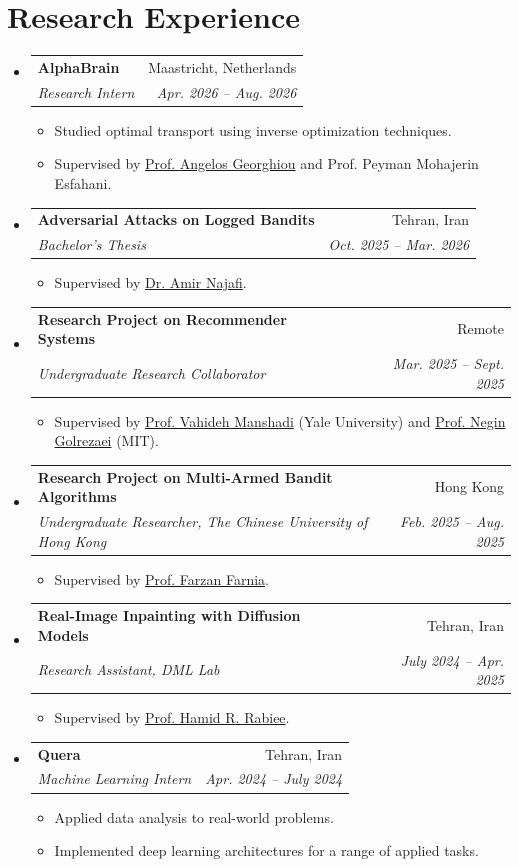 \documentclass[letterpaper,11pt]{article}
\makeatletter
\newcommand{\resumeItem}[1]{
  \item\small{#1}
}
\newcommand{\resumeSubheading}[4]{
  \item
  \begin{tabular*}{\linewidth}[t]{l@{\extracolsep{\fill}}r}
    \textbf{#1} & #2 \\
    \textit{\small #3} & \textit{\small #4} \\
  \end{tabular*}\vspace{-4pt}
}
\newcommand{\resumeSubHeadingListStart}{\begin{itemize}[leftmargin=0.15in,label={},itemsep=6pt,parsep=0pt,topsep=4pt]}
\newcommand{\resumeSubHeadingListEnd}{\end{itemize}}
\newcommand{\resumeItemListStart}{\begin{itemize}[leftmargin=0.22in,itemsep=2pt,parsep=0pt,topsep=4pt]}
\newcommand{\resumeItemListEnd}{\end{itemize}\vspace{-2pt}}
\makeatother
\begin{document}
\section{Research Experience}
\resumeSubHeadingListStart
  \resumeSubheading
    {AlphaBrain}{Maastricht, Netherlands}
    {Research Intern}{Apr. 2026 -- Aug. 2026}
    \resumeItemListStart
      \resumeItem{Studied optimal transport using inverse optimization techniques.}
      \resumeItem{Supervised by \href{https://www.ucy.ac.cy/directory/profile/ageorg07}{Prof. Angelos Georghiou} and Prof. Peyman Mohajerin Esfahani.}
    \resumeItemListEnd

  \resumeSubheading
    {Adversarial Attacks on Logged Bandits}{Tehran, Iran}
    {Bachelor's Thesis}{Oct. 2025 -- Mar. 2026}
    \resumeItemListStart
      \resumeItem{Supervised by \href{https://scholar.google.com/citations?user=N_zYPC0AAAAJ}{Dr. Amir Najafi}.}
    \resumeItemListEnd

  \resumeSubheading
    {Research Project on Recommender Systems}{Remote}
    {Undergraduate Research Collaborator}{Mar. 2025 -- Sept. 2025}
    \resumeItemListStart
      \resumeItem{Supervised by \href{https://som.yale.edu/faculty-research/faculty-directory/vahideh-manshadi}{Prof. Vahideh Manshadi} (Yale University) and \href{https://www.mit.edu/~golrezae/}{Prof. Negin Golrezaei} (MIT).}
    \resumeItemListEnd

  \resumeSubheading
    {Research Project on Multi-Armed Bandit Algorithms}{Hong Kong}
    {Undergraduate Researcher, The Chinese University of Hong Kong}{Feb. 2025 -- Aug. 2025}
    \resumeItemListStart
      \resumeItem{Supervised by \href{https://www.cse.cuhk.edu.hk/people/faculty/farzan-farnia/}{Prof. Farzan Farnia}.}
    \resumeItemListEnd

  \resumeSubheading
    {Real-Image Inpainting with Diffusion Models}{Tehran, Iran}
    {Research Assistant, DML Lab}{July 2024 -- Apr. 2025}
    \resumeItemListStart
      \resumeItem{Supervised by \href{https://sharif.edu/~rabiee/}{Prof. Hamid R. Rabiee}.}
    \resumeItemListEnd

  \resumeSubheading
    {Quera}{Tehran, Iran}
    {Machine Learning Intern}{Apr. 2024 -- July 2024}
    \resumeItemListStart
      \resumeItem{Applied data analysis to real-world problems.}
      \resumeItem{Implemented deep learning architectures for a range of applied tasks.}
    \resumeItemListEnd
\resumeSubHeadingListEnd

\newpage
\end{document}
